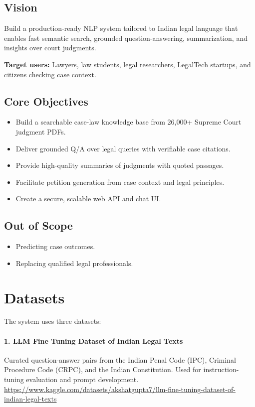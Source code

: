 \documentclass[11pt,a4paper]{article}
\begin{document}
\subsection{Vision}

Build a production-ready NLP system tailored to Indian legal language
that enables fast semantic search, grounded question-answering,
summarization, and insights over court judgments.

\textbf{Target users:} Lawyers, law students, legal researchers, LegalTech
startups, and citizens checking case context.

\subsection{Core Objectives}

\begin{itemize}[noitemsep]
    \item Build a searchable case-law knowledge base from 26,000+ Supreme
        Court judgment PDFs.
    \item Deliver grounded Q/A over legal queries with verifiable case
        citations.
    \item Provide high-quality summaries of judgments with quoted passages.
    \item Facilitate petition generation from case context and legal principles.
    \item Create a secure, scalable web API and chat UI.
\end{itemize}

\subsection{Out of Scope}

\begin{itemize}[noitemsep]
    \item Predicting case outcomes.
    \item Replacing qualified legal professionals.
\end{itemize}

\section{Datasets}

The system uses three datasets:

\paragraph{1. LLM Fine Tuning Dataset of Indian Legal Texts}
Curated question-answer pairs from the Indian Penal Code (IPC),
Criminal Procedure Code (CRPC), and the Indian Constitution.
Used for instruction-tuning evaluation and prompt development.\\
\url{https://www.kaggle.com/datasets/akshatgupta7/llm-fine-tuning-dataset-of-indian-legal-texts}
\end{document}
